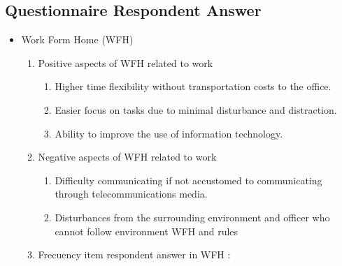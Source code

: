 \documentclass[conference]{IEEEtran}
\begin{document}
\subsection{Questionnaire Respondent Answer }
\begin{itemize}
\item {Work Form Home (WFH)}
\begin{enumerate}
\item{Positive aspects of WFH related to work}
\begin{enumerate}
\item Higher time flexibility without transportation costs to the office.
\item Easier focus on tasks due to minimal disturbance and distraction.
\item Ability to improve the use of information technology.
\end{enumerate}
\item{Negative aspects of WFH related to work}
\begin{enumerate}
\item Difficulty communicating if not accustomed to communicating through telecommunications media.
\item Disturbances from the surrounding environment and officer who cannot follow environment WFH and rules
\end{enumerate}
\item Frecuency item respondent answer in WFH :


\end{enumerate}
\end{itemize}
\end{document}
